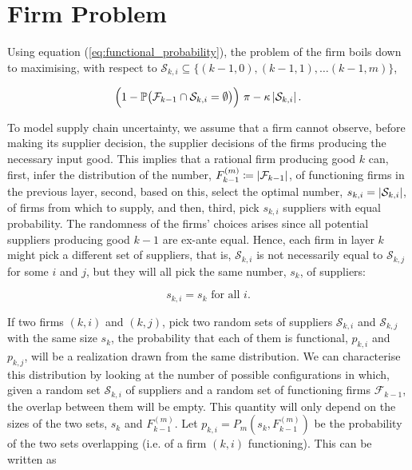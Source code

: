 \documentclass[../../main.tex]{subfiles}
\begin{document}
\section{Firm Problem}

Using equation (\ref{eq:functional_probability}), the problem of the firm boils down to maximising, with respect to $\mathcal{S}_{k, i} \subseteq \{(k-1, 0), (k-1, 1), \ldots (k-1, m)\}$, 

\begin{equation}
  \Big(1 - \mathbb{P}\big( \mathcal{F}_{k - 1} \cap \mathcal{S}_{k, i} = \emptyset \big) \Big) \ \pi  - \kappa \left\lvert\mathcal{S}_{k, i} \right\rvert.
\end{equation}


To model supply chain uncertainty, we assume that a firm cannot observe, before making its supplier decision, the supplier decisions of the firms producing the necessary input good. This implies that a rational firm producing good $k$ can, first, infer the distribution of the number, $F^{(m)}_{k - 1} \coloneqq \left\lvert\mathcal{F}_{k - 1}\right\rvert$, of functioning firms in the previous layer, second, based on this, select the optimal number, $s_{k, i} = \left\lvert\mathcal{S}_{k, i}\right\rvert$, of firms from which to supply, and then, third, pick $s_{k, i}$ suppliers with equal probability. The randomness of the firms' choices arises since all potential suppliers producing good $k - 1$ are ex-ante equal. Hence, each firm in layer $k$ might pick a different set of suppliers, that is, $\mathcal{S}_{k, i}$ is not necessarily equal to $\mathcal{S}_{k, j}$ for some $i$ and $j$, but they will all pick the same number, $s_k$, of suppliers:

\begin{equation}
  s_{k, i} = s_k \text{ for all } i.
\end{equation}

If two firms $(k, i)$ and $(k, j)$, pick two random sets of suppliers $\mathcal{S}_{k, i}$ and $\mathcal{S}_{k, j}$ with the same size $s_k$, the probability that each of them is functional, $p_{k, i}$ and $p_{k, j}$, will be a realization drawn from the same distribution. We can characterise this distribution by looking at the number of possible configurations in which, given a random set $\mathcal{S}_{k, i}$ of suppliers and a random set of functioning firms $\mathcal{F}_{k - 1}$, the overlap between them will be empty. This quantity will only depend on the sizes of the two sets, $s_k$ and $F^{(m)}_{k-1}$. Let $p_{k, i} = P_m(s_k, F^{(m)}_{k - 1})$ be the probability of the two sets overlapping (i.e. of a firm $(k, i)$ functioning). This can be written as 
\end{document}

